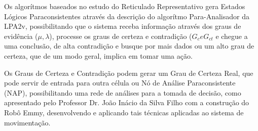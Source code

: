 Os algorítmos baseados no estudo do Reticulado Representativo gera 
Estados Lógicos Paraconsistentes através da 
descrição do algorítmo Para-Analisador da LPA2v, 
possibilitando que o sistema receba informação 
através dos graus de evidência ($\mu, \lambda$), 
processe os graus de certeza e contradição ($G_c e G_{ct}$ e 
chegue a uma conclusão, de alta contradição e busque por mais dados ou 
um alto grau de certeza, que de um modo geral, implica em tomar uma ação. 

Os Graus de Certeza e Contradição podem gerar um Grau de Certeza Real, 
que pode servir de entrada para outra célula ou 
Nó de Análise Paraconsistente (NAP), 
possibilitando uma rede de análises para a tomada de decisão,
como apresentado pelo Professor Dr. João Inácio da Silva Filho 
com a construção do Robô Emmy, 
desenvolvendo e aplicando tais técnicas aplicadas ao sistema de movimentação.






